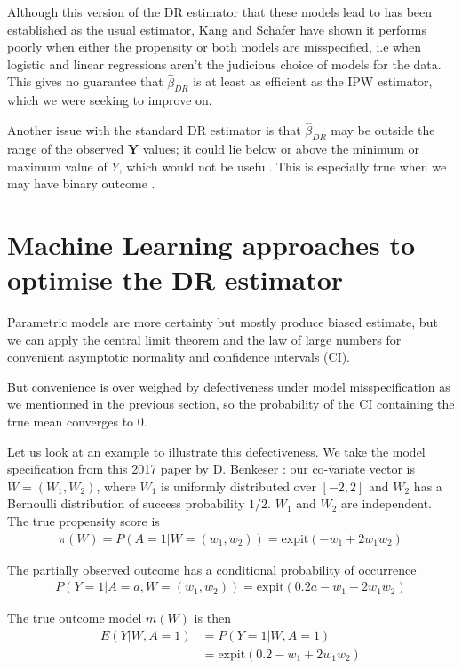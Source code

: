 \documentclass[12pt,twoside]{article}
\newcommand{\expit}{\text{expit}}
\begin{document}
Although this version of the DR estimator that these models lead to has been established as the usual estimator, Kang and Schafer \cite{kang} have shown it performs poorly when either the propensity or both models are misspecified, i.e when logistic and linear regressions aren't the judicious choice of models for the data. This gives no guarantee that $\hat\beta_{DR}$ is at least as efficient as the IPW estimator, which we were seeking to improve on.

Another issue with the standard DR estimator is that $\hat\beta_{DR}$ may be outside the range of the observed $\mathbf{Y}$ values; it could lie below or above the minimum or maximum value of $Y$, which would not be useful. This is especially true when we may have binary outcome \cite{vansteelandt}.

\section{Machine Learning approaches to optimise the DR estimator}

Parametric models are more certainty but mostly produce biased estimate, but we can apply the central limit theorem and the law of large numbers for convenient asymptotic normality and confidence intervals (CI).

But convenience is over weighed by defectiveness under model misspecification as we mentionned in the previous section, so the probability of the CI containing the true mean converges to 0. \cite{diaz}

Let us look at an example to illustrate this defectiveness. We take the model specification from this 2017 paper by D. Benkeser \cite{benkeser2017}: our co-variate vector is $W = (W_1, W_2)$, where $W_1$ is uniformly distributed over $[-2,2]$ and $W_2$ has a Bernoulli distribution of success probability $1/2$. $W_1$ and $W_2$ are independent. The true propensity score is 
\begin{align*}
    \pi(W) = P(A = 1 |W = (w_1,w_2)) = \expit(-w_1 + 2w_1w_2)
\end{align*}

The partially observed outcome has a conditional probability of occurrence 
\begin{align*}
    P(Y = 1|A = a,W = (w_1, w_2)) = \expit(0.2a - w_1 + 2w_1w_2)
\end{align*}

The true outcome model $m(W)$ is then 
\begin{align*}
    E(Y|W, A =1) &= P(Y = 1|W, A= 1) \\
    & = \expit(0.2 - w_1 + 2w_1w_2)
\end{align*}
\end{document}
